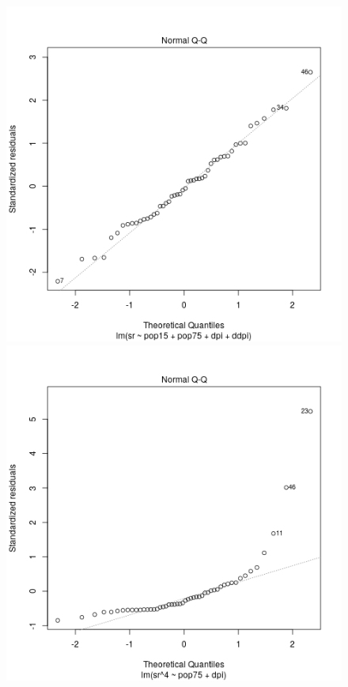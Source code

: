 \begin{figure}[p]
\begin{center}
    \includegraphics[scale=0.4]{plot12.png} \hspace*{2cm} \includegraphics[scale=0.4]{plot22.png} \\

\end{center}
\end{figure}
